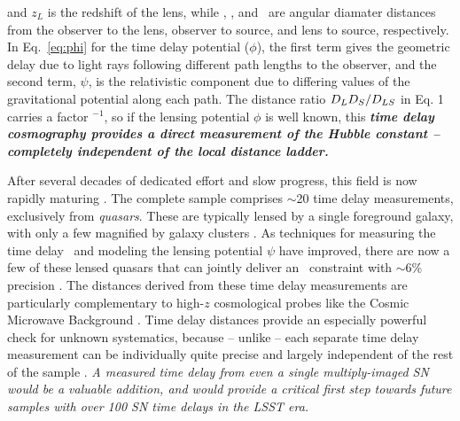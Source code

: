 \noindent and $z_L$ is the redshift of the lens, while \Dl, \Ds, 
and \Dls\ are angular diamater distances from the observer to the
lens, observer to source, and lens to source, respectively.  In
Eq.~\ref{eq:phi} for the time delay potential ($\phi$), the first term
gives the geometric delay due to light rays following different path
lengths to the observer, and the second term, $\psi$, is the
relativistic component due to differing values of the gravitational
potential along each path. The distance ratio $D_LD_S/D_{LS}$ in Eq. 1
carries a factor \Ho$^{-1}$, so if the lensing potential $\phi$ is
well known, this {\bf \em time delay cosmography provides a direct measurement of
the Hubble constant -- completely independent of the local distance
ladder.}

After several decades of dedicated effort and slow progress, this
field is now rapidly maturing \citep[see][for recent
reviews]{Jackson:2007,Treu:2010}.  The complete sample comprises
$\sim$20 time delay measurements, exclusively from {\em quasars}.
These are typically lensed by a single foreground galaxy, with only a
few magnified by galaxy clusters
\citep{Inada:2003,Inada:2006,Oguri:2008,Dahle:2013}.
As techniques for measuring the time delay \dt\ and modeling the
lensing potential $\psi$ have improved, there are now a few of these
lensed quasars that can jointly deliver an \Ho\ constraint with
$\sim$6\% precision \citep[e.g.][]{Suyu:2010,Suyu:2013}. The distances
derived from these time delay measurements are particularly
complementary to high-$z$ cosmological probes like the Cosmic
Microwave Background \citep[CMB; ][]{Linder:2011}.  Time delay
distances provide an especially powerful check for unknown
systematics, because -- unlike \SNIa -- each separate time delay
measurement can be individually quite precise and largely independent
of the rest of the sample \citep{Suyu:2013,Treu:2013}.  {\em A
measured time delay from even a single multiply-imaged SN would be a
valuable addition, and would provide a critical first step towards
future samples with over 100 SN time delays in the LSST era.}

